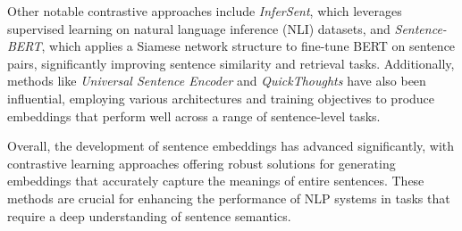 Other notable contrastive approaches include \textit{InferSent}, which leverages supervised learning on natural language inference (NLI) datasets, and \textit{Sentence-BERT}, which applies a Siamese network structure to fine-tune BERT on sentence pairs, significantly improving sentence similarity and retrieval tasks. Additionally, methods like \textit{Universal Sentence Encoder} and \textit{QuickThoughts} have also been influential, employing various architectures and training objectives to produce embeddings that perform well across a range of sentence-level tasks.

Overall, the development of sentence embeddings has advanced significantly, with contrastive learning approaches offering robust solutions for generating embeddings that accurately capture the meanings of entire sentences. These methods are crucial for enhancing the performance of NLP systems in tasks that require a deep understanding of sentence semantics.
\newpage